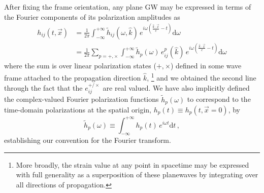 \documentclass[aps,prd,twocolumn,superscriptaddress,preprintnumbers,floatfix,nofootinbib]{revtex4-2}
\newcommand{\beq}{\begin{equation}}
\newcommand{\eeq}{\end{equation}}
\newcommand*{\eq}[1]{Eq.~\eqref{eq:#1}}
\newcommand{\infd}{\mathrm{d}}
\begin{document}

After fixing the frame orientation, any plane GW may be expressed in terms of the Fourier components of its polarization amplitudes as
\begin{align}
\label{eq:planewave}
h_{ij}(t,\vec{x}) &= \frac{1}{2\pi}\int_{-\infty}^{+\infty} \tilde{h}_{ij}(\omega, \hat{k})\, e^{i\omega \left(\frac{\hat{k}\cdot\vec{x}}{c}-t\right)} \infd \omega \\
&= \frac{1}{2\pi} \sum_{p=+,\times} \int_{-\infty}^{+\infty} \tilde{h}_p(\omega)\, e^p_{ij}(\hat{k})\, e^{i\omega \left(\frac{\hat{k}\cdot\vec{x}}{c}-t\right)} \infd \omega \nonumber
\end{align}
where the sum is over linear polarization states ($+,\times$) defined in some wave frame attached to the propagation direction $\hat{k}$,%
\footnote{More broadly, the strain value at any point in spacetime may be expressed with full generality as a superposition of these planewaves
by integrating over all directions of propagation.}
and we obtained the second line through the fact that the $e^{+/\times}_{ij}$ are real valued.
We have also implicitly defined the complex-valued Fourier polarization functions $\tilde{h}_p(\omega)$ to correspond to the time-domain polarizations at the spatial origin, $h_p(t) \equiv h_p(t, \vec{x}=0)$, by
\beq \label{eq:ft}
\tilde{h}_p(\omega) \equiv \int_{-\infty}^{+\infty} h_p(t)\, e^{i\omega t} \infd t \, ,
\eeq
establishing our convention for the Fourier transform.
\end{document}
